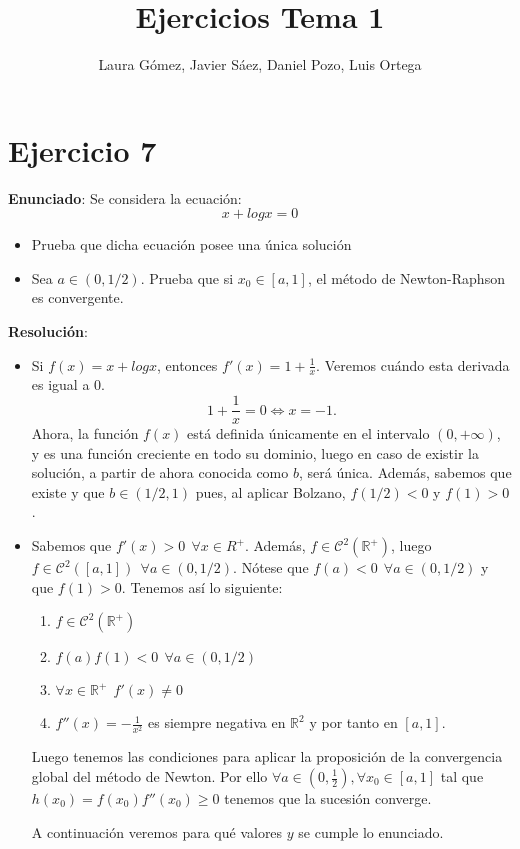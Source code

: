 \documentclass[11pt]{article}
\title{\textbf{Ejercicios Tema 1}}
\author{Laura Gómez, Javier Sáez, Daniel Pozo, Luis Ortega}
\begin{document}
\maketitle
\section{Ejercicio 7}
\textbf{Enunciado}: Se considera la ecuación:
\[
x + logx = 0
\]
\begin{itemize}
	\item Prueba que dicha ecuación posee una única solución
	\item Sea $a \in (0, 1/2)$. Prueba que si $x_0 \in [a,1]$, el método de Newton-Raphson es convergente.
\end{itemize}
\textbf{Resolución}:\\
\begin{itemize}
	\item Si $f(x) = x + logx$, entonces $f'(x) = 1 + \frac{1}{x}$. Veremos cuándo esta derivada es igual a 0.
	\[
	1+\frac{1}{x} = 0 \iff x = -1.
	\]
	Ahora, la función $f(x)$ está definida únicamente en el intervalo $(0,+\infty)$, y es una función creciente en todo su dominio, luego en caso de existir la solución, a partir de ahora conocida como $b$, será única. Además, sabemos que existe y que $b\in(1/2,1)$ pues, al aplicar Bolzano, $f(1/2) < 0$ y $f(1) > 0$.
	
	\item Sabemos que $f'(x)>0 \ \ \forall x \in R^+$. Además, $f\in \mathcal{C}^2(\mathbb{R}^+)$, luego $f\in \mathcal{C}^2([a,1]) \ \ \forall a \in (0,1/2)$. Nótese que $f(a) < 0 \ \ \forall a \in (0,1/2)$ y que $f(1) > 0$. Tenemos así lo siguiente:
	\begin{enumerate}
	\item $f \in \mathcal C ^2 (\mathbb R ^+)$
	\item $f(a)f(1) < 0 \ \  \forall a \in (0,1/2)$
	\item $\forall x \in \mathbb R ^+ \ \ f'(x) \ne 0$
	\item $f''(x)= -\frac{1}{x^2}$ es siempre negativa en $\mathbb R ^2$ y por tanto en $[a,1]$.
\end{enumerate}
Luego tenemos las condiciones para aplicar la proposición de la convergencia global del método de Newton. Por ello $\forall a \in (0,\frac{1}{2}), \forall x_0 \in [a,1]$ tal que $h(x_0)=f(x_0)f''(x_0)\geq0$ tenemos que la sucesión converge.

A continuación veremos para qué valores $y$ se cumple lo enunciado.


\end{itemize}
\end{document}
